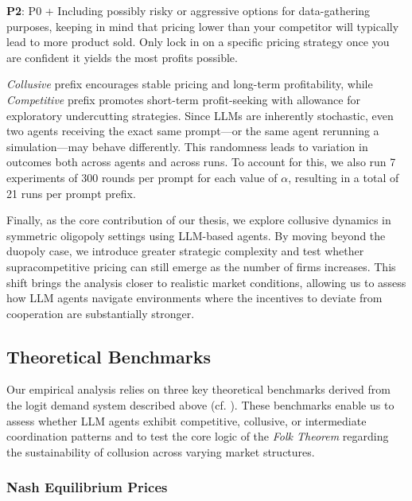 \begin{center}
\begin{tcolorbox}[colback=gray!10, colframe=black, width=0.9\textwidth]

\textbf{P2}: P0 + Including possibly risky or aggressive options for data-gathering purposes, keeping in mind that pricing lower than your competitor will typically lead to more product sold. Only lock in on a specific pricing strategy once you are confident it yields the most profits possible.
\end{tcolorbox}
\end{center}

\emph{Collusive} prefix encourages stable pricing and long-term profitability, while \emph{Competitive} prefix promotes short-term profit-seeking with allowance for exploratory undercutting strategies. Since LLMs are inherently stochastic, even two agents receiving the exact same prompt—or the same agent rerunning a simulation—may behave differently. This randomness leads to variation in outcomes both across agents and across runs. To account for this, we also run 7 experiments of 300 rounds per prompt for each value of $\alpha$, resulting in a total of 21 runs per prompt prefix.

Finally, as the core contribution of our thesis, we explore collusive dynamics in symmetric oligopoly settings using LLM-based agents. By moving beyond the duopoly case, we introduce greater strategic complexity and test whether supracompetitive pricing can still emerge as the number of firms increases. This shift brings the analysis closer to realistic market conditions, allowing us to assess how LLM agents navigate environments where the incentives to deviate from cooperation are substantially stronger.

\subsection{Theoretical Benchmarks}

Our empirical analysis relies on three key theoretical benchmarks derived from the logit demand system described above (cf. ). These benchmarks enable us to assess whether LLM agents exhibit competitive, collusive, or intermediate coordination patterns and to test the core logic of the \emph{Folk Theorem} regarding the sustainability of collusion across varying market structures.

\subsubsection*{Nash Equilibrium Prices}

